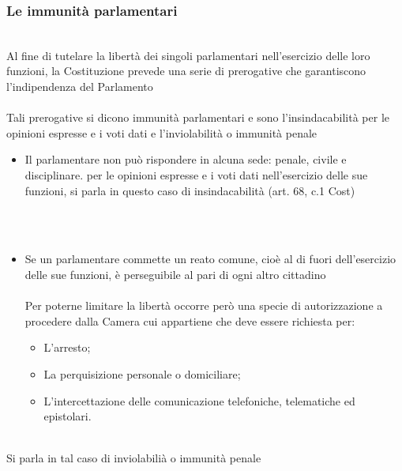 \documentclass{report}
\begin{document}
\subsubsection{Le immunità parlamentari}
\\
Al fine di tutelare la libertà dei singoli parlamentari nell'esercizio delle loro funzioni, la Costituzione prevede una serie di prerogative che garantiscono l'indipendenza del Parlamento
\\
\\
Tali prerogative si dicono immunità parlamentari e sono l'insindacabilità per le opinioni espresse e i voti dati e l'inviolabilità o immunità penale
\\
\begin{itemize}
  \item Il parlamentare non può rispondere in alcuna sede: penale, civile e disciplinare. per le opinioni espresse e i voti dati nell'esercizio delle sue funzioni, si parla in questo caso di insindacabilità (art. 68, c.1 Cost)
\end{itemize}
\\
\\
\begin{itemize}
  \item{Se un parlamentare commette un reato comune, cioè al di fuori dell'esercizio delle sue funzioni, è perseguibile al pari di ogni altro cittadino 
\\
\\
Per poterne limitare la libertà occorre però una specie di autorizzazione a procedere dalla Camera cui appartiene che deve essere richiesta per:
\begin{itemize}
  \item L'arresto;
  \item La perquisizione personale o domiciliare;
  \item L'intercettazione delle comunicazione telefoniche, telematiche ed epistolari.
\end{itemize}
}
\end{itemize}
\\
Si parla in tal caso di inviolabilià o immunità penale
\\
\end{document}
